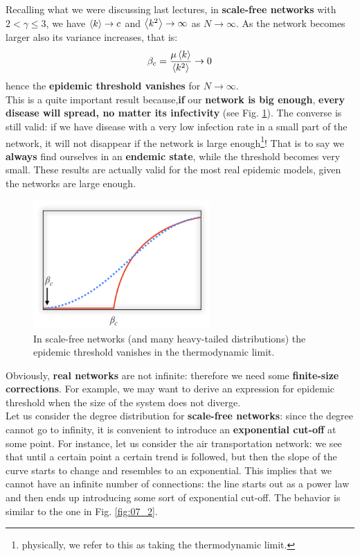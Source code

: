 \documentclass[../main/main.tex]{subfiles}
\begin{document}
\medskip

Recalling what we were discussing last lectures, in \textbf{scale-free networks} with \( 2 < \gamma \le 3  \), we have \( \expval{k} \rightarrow c  \) and \( \expval{k^2}  \rightarrow \infty  \) as \( N \rightarrow \infty  \).
As the network becomes larger also its variance increases, that is:
\begin{equation*}
  \beta _c = \frac{\mu \expval{k} }{\expval{k^2} } \rightarrow 0
\end{equation*}
hence the \textbf{epidemic threshold vanishes} for \( N \rightarrow \infty  \).\\
This is a quite important result because,\textbf{if} our \textbf{network is big enough}, \textbf{every disease will spread, no matter its infectivity} (see Fig. \ref{fig:07_1}). The converse is still valid: if we have disease with a very low infection rate in a small part of the network, it will not disappear if the network is large enough\footnote{physically, we refer to this as taking the thermodynamic limit.}! That is to say we \textbf{always} find ourselves in an \textbf{endemic state}, while the threshold becomes very small. These results are actually valid for the most real epidemic models, given the networks are large enough.

\begin{figure}[h!]
\centering
\includegraphics[width=0.6\textwidth]{../lessons/image/07/1.png}
\caption{\label{fig:07_1} In scale-free networks (and many heavy-tailed distributions) the epidemic threshold vanishes in the thermodynamic limit.}
\end{figure}

Obviously, \textbf{real networks} are not infinite: therefore we need some \textbf{finite-size corrections}. For example, we may want to derive an expression for epidemic threshold when the size of the system does not diverge.\\ 
Let us consider the degree distribution for \textbf{scale-free networks}: since the degree cannot go to infinity, it is convenient to introduce an \textbf{exponential cut-off} at some point. For instance, let us consider the air transportation network: we see that until a certain point a certain trend is followed, but then the slope of the curve starts to change and resembles to an exponential. This implies that we cannot have an infinite number of connections: the line starts out as a power law and then ends up introducing some sort of exponential cut-off. The behavior is similar to the one in Fig. \ref{fig:07_2}.
\end{document}
